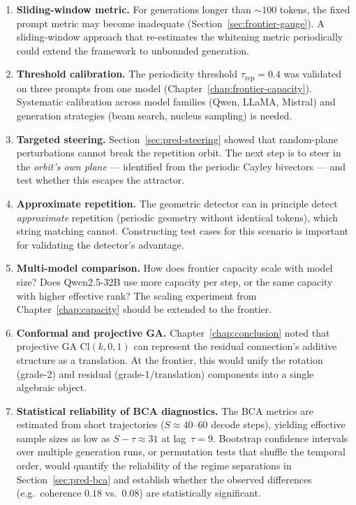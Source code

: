 \documentclass[11pt, twoside, openright]{memoir}
\numberwithin{equation}{chapter}
\begin{document}
\begin{enumerate}[nosep]
\item \textbf{Sliding-window metric.}
  For generations longer than $\sim\!100$ tokens, the fixed prompt
  metric may become inadequate
  (Section~\ref{sec:frontier-gauge}).  A sliding-window approach
  that re-estimates the whitening metric periodically could extend
  the framework to unbounded generation.

\item \textbf{Threshold calibration.}
  The periodicity threshold $\tau_{\mathrm{rep}} = 0.4$ was
  validated on three prompts from one model
  (Chapter~\ref{chap:frontier-capacity}).  Systematic calibration
  across model families (Qwen, LLaMA, Mistral) and generation
  strategies (beam search, nucleus sampling) is needed.

\item \textbf{Targeted steering.}
  Section~\ref{sec:pred-steering} showed that random-plane
  perturbations cannot break the repetition orbit.  The next step
  is to steer in the \emph{orbit's own plane} --- identified from
  the periodic Cayley bivectors --- and test whether this
  escapes the attractor.

\item \textbf{Approximate repetition.}
  The geometric detector can in principle detect \emph{approximate}
  repetition (periodic geometry without identical tokens), which
  string matching cannot.  Constructing test cases for this
  scenario is important for validating the detector's advantage.

\item \textbf{Multi-model comparison.}
  How does frontier capacity scale with model size?  Does
  Qwen2.5-32B use more capacity per step, or the same capacity
  with higher effective rank?  The scaling experiment from
  Chapter~\ref{chap:capacity} should be extended to the frontier.

\item \textbf{Conformal and projective GA.}
  Chapter~\ref{chap:conclusion} noted that projective GA
  $\mathrm{Cl}(k,0,1)$ can represent the residual connection's
  additive structure as a translation.  At the frontier, this
  would unify the rotation (grade-2) and residual
  (grade-1/translation) components into a single algebraic object.

\item \textbf{Statistical reliability of BCA diagnostics.}
  The BCA metrics are estimated from short trajectories
  ($S \approx 40$--$60$ decode steps), yielding effective sample
  sizes as low as $S - \tau \approx 31$ at lag~$\tau = 9$.
  Bootstrap confidence intervals over multiple generation runs,
  or permutation tests that shuffle the temporal order, would
  quantify the reliability of the regime separations in
  Section~\ref{sec:pred-bca} and establish whether the observed
  differences (e.g.\ coherence $0.18$ vs.\ $0.08$) are
  statistically significant.
\end{enumerate}
\end{document}
